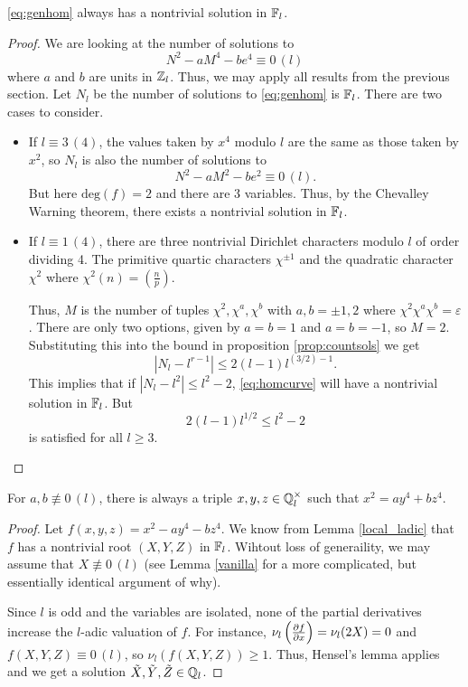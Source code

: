 \documentclass[12pt, a4paper]{report}
\begin{document}
\begin{lemma} \label{local_ladic}
  \autoref{eq:genhom} always has a nontrivial solution in $\mathbb{F}_l$.
\end{lemma}
\begin{proof}
  We are looking at the number of solutions to
  \[ N^2 - aM^4 - be^4 \equiv 0 \, (l)\]
  where $a$ and $b$ are units in ${\mathbb Z}_l$. Thus, we may apply all results from
  the previous section. Let $N_l$ be the number of solutions to
  \autoref{eq:genhom} is $\mathbb{F}_l$. There are two cases to consider.
  
  \begin{itemize}
  \item If $l \equiv 3 \, (4)$, the values taken by $x^4$ modulo $l$
    are the same as those taken
    by $x^2$, so $N_l$ is also the number of solutions to
    \[N^2 - aM^2 - be^2 \equiv 0 \, (l).\]
    But here $\text{deg}(f) = 2$ and there are 3 variables.
    Thus, by the Chevalley Warning theorem, there exists a nontrivial solution
    in $\mathbb{F}_l$.

  \item If $l \equiv 1 \, (4)$, there are three nontrivial Dirichlet
    characters modulo $l$ of order dividing 4. The primitive quartic
    characters $\chi^{\pm 1}$ and the quadratic character $\chi^2$ where $\chi^2(n) =
    (\frac{n}{p})$.

    Thus, $M$ is the number of tuples $\chi^2, \chi^a, \chi^b$ with
    $a,b = \pm 1, 2$ where $\chi^2 \chi^a \chi^b = \varepsilon$. There are only
    two options, given by $a = b = 1$ and $a = b = -1$, so $M = 2$.
    Substituting this into the bound in proposition \autoref{prop:countsols} we get
    \[|N_l - l^{r-1} | \leq 2(l-1) l^{(3/2)-1}.\]
    This implies that if $|N_l-l^2| \leq l^2-2$, \autoref{eq:homcurve} will have
    a nontrivial solution in $\mathbb{F}_l$. But
    \[2(l-1)l^{1/2} \leq l^2 - 2\]
    is satisfied for all $l \geq 3$.
  \end{itemize}
  
\end{proof}

\begin{thm}
  For $a, b \not\equiv 0 \, (l)$, there is always a triple
  $x, y, z \in {\mathbb Q}_l^{\times}$ such that $x^2 = ay^4 + bz^4$.
\end{thm}
\begin{proof}
  Let $f(x,y,z) = x^2 - ay^4 - bz^4$. We know from Lemma \autoref{local_ladic}
  that $f$ has a nontrivial root $(X,Y,Z)$ in $\mathbb{F}_l$. Wihtout loss of generaility,
  we may assume that $X \not\equiv 0 \, (l)$ (see Lemma \autoref{vanilla} for a
  more complicated, but essentially identical argument of why).

  Since $l$ is odd and the variables are isolated,
  none of the partial derivatives increase the $l$-adic valuation
  of $f$. For instance, $\nu_l \left( \frac{\partial f}{\partial x} \right)=
  \nu_l(2X) = 0$ and $f(X,Y,Z) \equiv 0 \, (l)$, so $\nu_l(f(X,Y,Z)) \geq 1$.
  Thus, Hensel's lemma applies and we get a solution $\tilde{X}, \tilde{Y}, \tilde{Z}
  \in {\mathbb Q}_l$. 
\end{proof}
  
\end{document}

